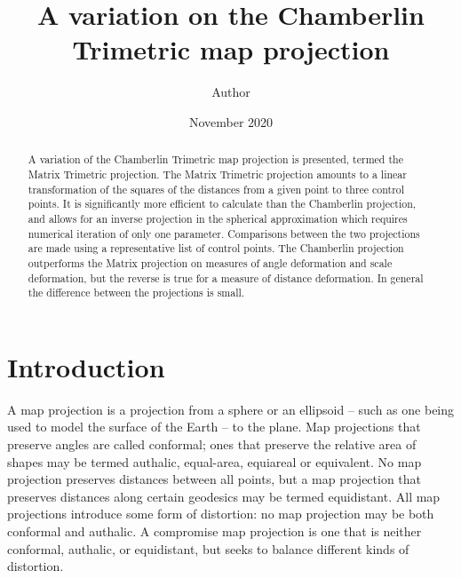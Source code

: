 \documentclass[]{interact}
\title{A variation on the Chamberlin Trimetric map projection}
\author{Author}
\date{November 2020}
\begin{document}
\begin{abstract}
   A variation of the Chamberlin Trimetric map projection is presented,
   termed the Matrix Trimetric projection. The Matrix Trimetric projection
   amounts to a linear transformation of the squares of the distances
   from a given point to three control points. It is significantly more
   efficient to calculate than the Chamberlin projection, and allows for an
   inverse projection in the spherical approximation which requires numerical
   iteration of only one parameter. Comparisons between the two projections
   are made using a representative list of control points. The Chamberlin
   projection outperforms the Matrix projection on measures of angle deformation
   and scale deformation, but the reverse is true for a measure of distance
   deformation. In general the difference between the projections is small.

\end{abstract}
\maketitle

\section{Introduction}
A map projection is a projection from a sphere or an ellipsoid -- such as one
being used to model the surface of the Earth -- to the plane. Map projections
that preserve angles are called conformal; ones that preserve the relative area
of shapes may be termed authalic, equal-area, equiareal or equivalent. No map
projection preserves distances between all points, but a map projection that
preserves distances along certain geodesics may be termed equidistant. All map
projections introduce some form of distortion: no map projection may be both
conformal and authalic.\citep{snyder87}
A compromise map projection is one that is neither conformal, authalic,
or equidistant, but seeks to balance different kinds of distortion.
\end{document}
